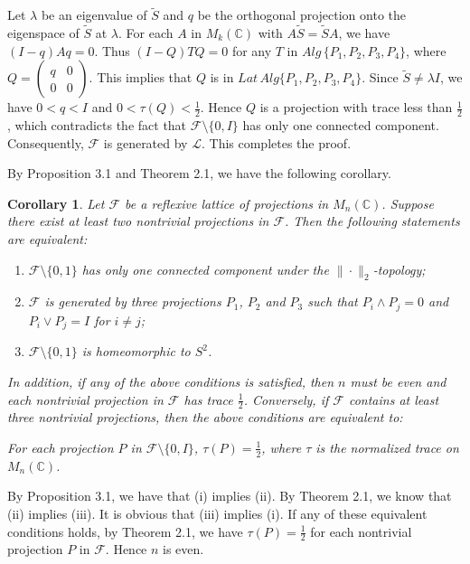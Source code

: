 \documentclass[12pt]{article}
\newtheorem{corollary}{Corollary}[section]
\newcommand{\LLL}{\mathcal L} %
\newcommand{\FFF}{\mathcal F}
\newcommand{\C}{\mathbb C} %
\begin{document}
{Let $\lambda$ be an eigenvalue of $\widetilde{S}$ and $q$ be the
orthogonal projection onto the eigenspace of $\widetilde{S}$ at
$\lambda$. For each $A$ in $M_k(\C)$ with
$A\widetilde{S}=\widetilde{S}A$, we have $(I-q)Aq = 0$. Thus
$(I-Q)TQ = 0$ for any $T$ in $Alg\,\{P_1,P_2,P_3,P_4\}$, where
$Q=\left(\begin{array}{cc} q&0\\0&0\end{array}\right)$. This implies
that $Q$ is in $Lat\,Alg\{P_1,P_2,P_3,P_4\}$. Since $\widetilde{S}
\neq \lambda I$, we have $0 < q < I$ and $0<\tau(Q)<\frac 12$. Hence
$Q$ is a projection with trace less than $\frac12$ , which
contradicts the fact that $\FFF \setminus \{0, I\}$ has only one
connected component. Consequently, $\FFF$ is generated by $\LLL$.
This completes the proof.

\vspace{2mm}

By Proposition 3.1 and Theorem 2.1, we have the following corollary.

\begin{corollary}
 Let $\FFF$ be a reflexive lattice of projections in $M_n(\C)$. Suppose there exist at least two
nontrivial projections in $\FFF$. Then the following statements are
equivalent:
\begin{enumerate}
\item[(i)] $\FFF \setminus \{0, 1 \}$ has only one connected component under the $\|\cdot\|_2$-topology;
\item[(ii)] $\FFF$ is generated by three projections $P_1$,
$P_2$ and $P_3$ such that $P_i \wedge P_j = 0$ and $P_i \vee P_j =
I$ for $i \neq j$;
\item[(iii)] $\FFF \setminus \{0, 1 \}$ is  homeomorphic to
$S^2$.
\end{enumerate}

In addition, if any of the above conditions is satisfied, then $n$
must be even and each nontrivial projection in $\FFF$ has trace
$\frac12$.  Conversely, if $\FFF$ contains at least three nontrivial
projections, then the above conditions are equivalent to:

For each projection $P$ in $\FFF\setminus \{0,I\}$, $\tau(P)=\frac
12$, where $\tau$ is the normalized trace on $M_n(\C)$.

\end{corollary}

\quad By Proposition 3.1, we have that (i)
implies (ii). By Theorem 2.1, we know that (ii) implies (iii). It is
obvious that (iii) implies (i). If any of these equivalent
conditions holds, by Theorem 2.1, we have $\tau(P)=\frac 12$ for
each nontrivial projection $P$ in $\FFF$. Hence $n$ is even.

}
\end{document}
